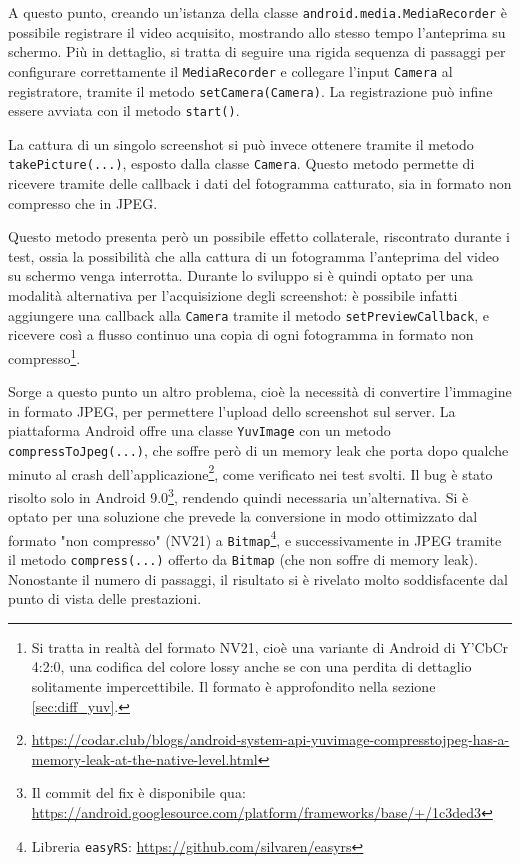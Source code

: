 A questo punto, creando un'istanza della classe \texttt{android.media.MediaRecorder} è possibile registrare il video acquisito, mostrando allo stesso tempo l'anteprima su schermo. Più in dettaglio, si tratta di seguire una rigida sequenza di passaggi\footnotemark{} per configurare correttamente il \texttt{MediaRecorder} e collegare l'input \texttt{Camera} al registratore, tramite il metodo \texttt{setCamera(Camera)}. La registrazione può infine essere avviata con il metodo \texttt{start()}.


La cattura di un singolo screenshot si può invece ottenere tramite il metodo \texttt{takePicture(...)}, esposto dalla classe \texttt{Camera}. Questo metodo permette di ricevere tramite delle callback i dati del fotogramma catturato, sia in formato non compresso che in JPEG.

Questo metodo presenta però un possibile effetto collaterale, riscontrato durante i test, ossia la possibilità che alla cattura di un fotogramma l'anteprima del video su schermo venga interrotta. Durante lo sviluppo si è quindi optato per una modalità alternativa per l'acquisizione degli screenshot: è possibile infatti aggiungere una callback alla \texttt{Camera} tramite il metodo \texttt{setPreviewCallback}, e ricevere così a flusso continuo una copia di ogni fotogramma in formato non compresso\footnote{Si tratta in realtà del formato NV21, cioè una variante di Android di Y'CbCr 4:2:0, una codifica del colore lossy anche se con una perdita di dettaglio solitamente impercettibile. Il formato è approfondito nella sezione \ref{sec:diff_yuv}.}.

Sorge a questo punto un altro problema, cioè la necessità di convertire l'immagine in formato JPEG, per permettere l'upload dello screenshot sul server. La piattaforma Android offre una classe \texttt{YuvImage} con un metodo \texttt{compressToJpeg(...)}, che soffre però di un memory leak che porta dopo qualche minuto al crash dell'applicazione\footnote{\url{https://codar.club/blogs/android-system-api-yuvimage-compresstojpeg-has-a-memory-leak-at-the-native-level.html}}, come verificato nei test svolti. Il bug è stato risolto solo in Android 9.0\footnote{Il commit del fix è disponibile qua: \url{https://android.googlesource.com/platform/frameworks/base/+/1c3ded3}}, rendendo quindi necessaria un'alternativa. Si è optato per una soluzione che prevede la conversione in modo ottimizzato dal formato "non compresso" (NV21) a \texttt{Bitmap}\footnote{Libreria \texttt{easyRS}: \url{https://github.com/silvaren/easyrs}}, e successivamente in JPEG tramite il metodo \texttt{compress(...)} offerto da \texttt{Bitmap} (che non soffre di memory leak). Nonostante il numero di passaggi, il risultato si è rivelato molto soddisfacente dal punto di vista delle prestazioni.


